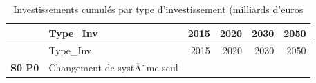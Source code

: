 \documentclass[]{article}
\begin{document}
\begin{longtable}[]{@{}clrrrr@{}}
\caption{Investissements cumulés par type d'investissement (milliards
d'euros}\tabularnewline
\toprule
\begin{minipage}[b]{0.17\columnwidth}\centering\strut
~\strut
\end{minipage} & \begin{minipage}[b]{0.29\columnwidth}\raggedright\strut
Type\_Inv\strut
\end{minipage} & \begin{minipage}[b]{0.09\columnwidth}\raggedleft\strut
2015\strut
\end{minipage} & \begin{minipage}[b]{0.09\columnwidth}\raggedleft\strut
2020\strut
\end{minipage} & \begin{minipage}[b]{0.09\columnwidth}\raggedleft\strut
2030\strut
\end{minipage} & \begin{minipage}[b]{0.09\columnwidth}\raggedleft\strut
2050\strut
\end{minipage}\tabularnewline
\midrule
\endfirsthead
\toprule
\begin{minipage}[b]{0.17\columnwidth}\centering\strut
~\strut
\end{minipage} & \begin{minipage}[b]{0.29\columnwidth}\raggedright\strut
Type\_Inv\strut
\end{minipage} & \begin{minipage}[b]{0.09\columnwidth}\raggedleft\strut
2015\strut
\end{minipage} & \begin{minipage}[b]{0.09\columnwidth}\raggedleft\strut
2020\strut
\end{minipage} & \begin{minipage}[b]{0.09\columnwidth}\raggedleft\strut
2030\strut
\end{minipage} & \begin{minipage}[b]{0.09\columnwidth}\raggedleft\strut
2050\strut
\end{minipage}\tabularnewline
\midrule
\endhead
\begin{minipage}[t]{0.17\columnwidth}\centering\strut
\textbf{S0 P0}\strut
\end{minipage} & \begin{minipage}[t]{0.29\columnwidth}\raggedright\strut
Changement de systÃ¨me seul\strut
\end{minipage} & \begin{minipage}[t]{0.09\columnwidth}\raggedleft\strut

\end{minipage}
\end{longtable}
\end{document}
